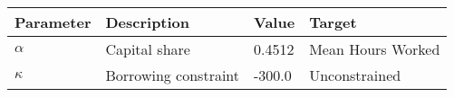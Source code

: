 \begin{tabular}{l l l l} 
\hline 
Parameter & Description & Value & Target \\ 
\hline 
$\alpha$ & Capital share & 0.4512 & Mean Hours Worked \\ 
$\kappa$ & Borrowing constraint & -300.0 & Unconstrained \\ 
\hline 
\end{tabular}